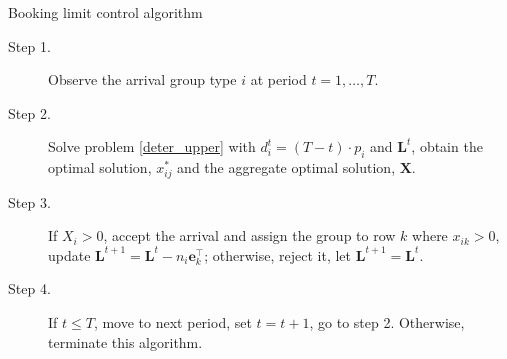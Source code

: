 \begin{algorithm}[H]
  \caption{Booking limit control algorithm}
  \begin{description}
    \item[Step 1.] Observe the arrival group type $i$ at period $t = 1, \ldots, T$.
    \item[Step 2.] Solve problem \eqref{deter_upper} with $d_i^{t} = (T-t) \cdot p_i$ and $\mathbf{L}^{t}$, obtain the optimal solution, $x_{ij}^{*}$ and the aggregate optimal solution, $\mathbf{X}$.
    \item[Step 3.] If $X_{i} > 0$, accept the arrival and assign the group to row $k$ where $x_{ik} > 0$, update $\mathbf{L}^{t+1} = \mathbf{L}^{t} - n_i \mathbf{e}_{k}^{\top}$; otherwise, reject it, let $\mathbf{L}^{t+1} = \mathbf{L}^{t}$.
    \item[Step 4.] If $t \leq T$, move to next period, set $t = t+1$, go to step 2. Otherwise, terminate this algorithm.
  \end{description}
\end{algorithm}




